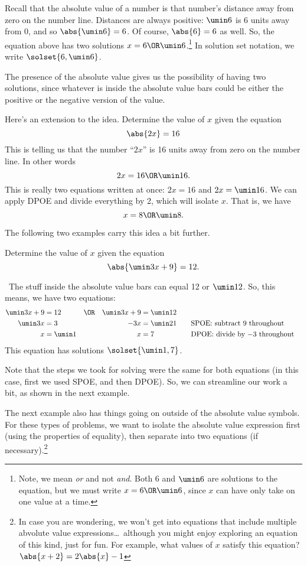 Recall that the absolute value of a number is that number's distance away from zero on the number line. Distances are always positive: $\umin6$ is 6 units away from 0, and so $\abs{\umin6}=6$. Of course, $\abs{6} = 6$ as well. So, the equation above has two solutions $x = 6 \OR \umin6$.\footnote{Note, we mean \textit{or} and not \textit{and}. Both 6 and $\umin6$ are solutions to the equation, but we must write $x=6 \OR \umin6$, since $x$ can have only take on one value at a time.} In solution set notation, we write $\solset{6, \umin6}$.

The presence of the absolute value gives us the possibility of having two solutions, since whatever is inside the absolute value bars could be either the positive or the negative version of the value.

Here's an extension to the idea. Determine the value of $x$ given the equation \[\abs{2x} = 16\]
This is telling us that the number ``$2x$'' is 16 units away from zero on the number line. In other words \[2x = 16 \OR \umin16.\]
This is really two equations written at once: $2x = 16$ and $2x = \umin16$. We can apply DPOE and divide everything by 2, which will isolate $x$. That is, we have \[x = 8 \OR \umin8.\]

The following two examples carry this idea a bit further.

\begin{boxedex}
Determine the value of $x$ given the equation \[\abs{\umin3x+9} = 12.\]

\exsoln\ The stuff inside the absolute value bars can equal 12 or $\umin12$. So, this means, we have two equations:
\[\begin{aligned}
\umin3x + 9 &= 12 	&\OR 	&&\umin3x + 9 &= \umin12\\
\umin3x  &= 3 		&	 	&&-3x &= \umin21
&&\text{\quad SPOE: subtract 9 throughout}\\
x &= \umin1 		&	 	&&x &= 7
&&\text{\quad DPOE: divide by $-3$ throughout}\\
\end{aligned}\]
This equation has solutions $\solset{\umin1, 7}$.
\end{boxedex}

Note that the steps we took for solving were the same for both equations (in this case, first we used SPOE, and then DPOE). So, we can streamline our work a bit, as shown in the next example.

The next example also has things going on outside of the absolute value symbols. For these types of problems, we want to isolate the absolute value expression first (using the properties of equality), then separate into two equations (if necessary).\footnote{In case you are wondering, we won't get into equations that include multiple abvolute value expressions\ldots\ although you might enjoy exploring an equation of this kind, just for fun. For example, what values of $x$ satisfy this equation? $\abs{x+2}=2\abs{x}-1$}

